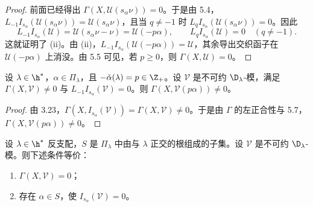 \begin{proof}
前面已经得出 $\Gamma(X,\mathcal{U}(s_\alpha\nu))=0$。于是由 5.4，$L_{-1}I_{s_\alpha}(\mathcal{U}(s_\alpha\nu))=\mathcal{U}(s_\alpha\nu)$，且当 $q\ne-1$ 时 $L_qI_{s_\alpha}(\mathcal{U}(s_\alpha\nu))=0$。因此
$$L_{-1}I_{s_\alpha}(\mathcal{U})=\mathcal{U}(s_\alpha\nu-\nu)=\mathcal{U}(-p\alpha),\qquad
L_qI_{s_\alpha}(\mathcal{U})=0\quad(q\ne-1).$$
这就证明了 (ii)。由 (ii)，$L_{-1}I_{s_\alpha}(\mathcal{U}(-p\alpha))=\mathcal{U}$，其余导出交织函子在 $\mathcal{U}(-p\alpha)$ 上消没。由 5.5 可见，若 $p\ge 0$，则 $\Gamma(X,\mathcal{U})=0$。
\end{proof}

\begin{corollary}\label{cor:03.5.8}
设 $\lambda\in\h^*$，$\alpha\in\Pi_\lambda$，且 $-\check{\alpha}(\lambda)=p\in\Z_+$。设 $\mathcal{V}$ 是不可约 $\D_\lambda$-模，满足 $\Gamma(X,\mathcal{V})\ne 0$ 与 $L_{-1}I_{s_\alpha}(\mathcal{V})=0$。则 $\Gamma(X,\mathcal{V}(p\alpha))\ne 0$。
\end{corollary}

\begin{proof}
由 3.23，$\Gamma(X,I_{s_\alpha}(\mathcal{V}))=\Gamma(X,\mathcal{V})\ne 0$。于是由 $\Gamma$ 的左正合性与 5.7，$\Gamma(X,\mathcal{V}(p\alpha))\ne 0$。
\end{proof}

\begin{theorem}\label{thm:03.5.9}
设 $\lambda\in\h^*$ 反支配，$S$ 是 $\Pi_\lambda$ 中由与 $\lambda$ 正交的根组成的子集。设 $\mathcal{V}$ 是不可约 $\D_\lambda$-模。则下述条件等价：
\begin{enumerate}[label=(\roman*)]
\item $\Gamma(X,\mathcal{V})=0$；
\item 存在 $\alpha\in S$，使 $I_{s_\alpha}(\mathcal{V})=0$。
\end{enumerate}
\end{theorem}

